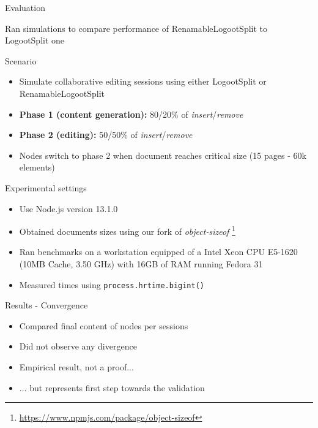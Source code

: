 \begin{frame}[standout]
  \alert{Evaluation}

  \bigskip
  Ran simulations to compare performance of RenamableLogootSplit to LogootSplit one
\end{frame}

\begin{frame}{Scenario}
  \begin{itemize}
    \item Simulate collaborative editing sessions using either LogootSplit or RenamableLogootSplit
    \item \textbf{Phase 1 (content generation):} 80/20\% of \emph{insert}/\emph{remove}
    \item \textbf{Phase 2 (editing):} 50/50\% of \emph{insert}/\emph{remove}
    \item Nodes switch to phase 2 when document reaches critical size (15 pages - 60k elements)
  \end{itemize}
\end{frame}

\begin{frame}{Experimental settings}
  \begin{itemize}
    \item Use Node.js version 13.1.0
    \item Obtained documents sizes using our fork of \emph{object-sizeof} \footnote{\url{https://www.npmjs.com/package/object-sizeof}}
    \item Ran benchmarks on a workstation equipped of a Intel Xeon CPU E5-1620 (10MB Cache, 3.50 GHz) with 16GB of RAM running Fedora 31
    \item Measured times using \texttt{process.hrtime.bigint()}
  \end{itemize}
\end{frame}

\begin{frame}{Results - Convergence}
  \begin{itemize}
    \item Compared final content of nodes per sessions
    \item Did not observe any divergence
    \bigskip
    \item Empirical result, not a proof...
    \item ... but represents first step towards the validation
  \end{itemize}
\end{frame}

